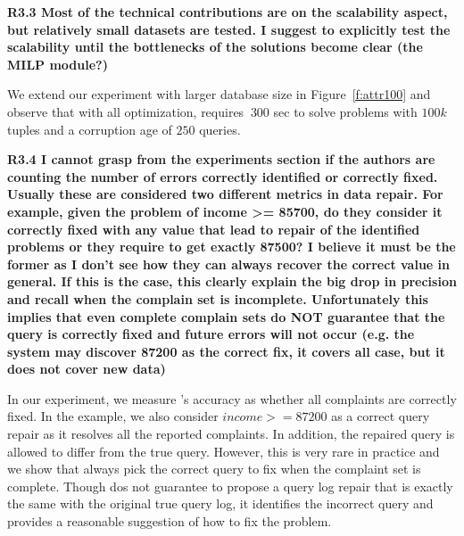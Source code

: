 \noindent \textbf{R3.3 Most of the technical contributions are on the scalability aspect, but relatively small datasets are tested. I suggest to explicitly test the scalability until the bottlenecks of the solutions become clear (the MILP module?)}

We extend our experiment with larger database size in Figure~\ref{f:attr100} and observe that with all optimization, \sys requires $~300$ sec to solve problems with $100k$ tuples and a corruption age of $250$ queries. 

\noindent \textbf{R3.4 I cannot grasp from the experiments section if the authors are counting the number of errors correctly identified or correctly fixed. Usually these are considered two different metrics in data repair. For example, given the problem of income >= 85700, do they consider it correctly fixed with any value that lead to repair of the identified problems or they require to get exactly 87500? 
I believe it must be the former as I don't see how they can always recover the correct value in general. If this is the case, this clearly explain the big drop in precision and recall when the complain set is incomplete. Unfortunately this implies that even complete complain sets do NOT guarantee that the query is correctly fixed and future errors will not occur (e.g. the system may discover 87200 as the correct fix, it covers all case, but it does not cover new data)}

In our experiment, we measure \sys's accuracy as whether all complaints are correctly fixed. In the example, we also consider $income >= 87200$ as a correct query repair as it resolves all the reported complaints. In addition, the repaired query is allowed to differ from the true query. However, this is very rare in practice and we show that \sys always pick the correct query to fix when the complaint set is complete. Though \sys dos not guarantee to propose a query log repair that is exactly the same with the original true query log, it identifies the incorrect query and provides a reasonable suggestion of how to fix the problem. 

